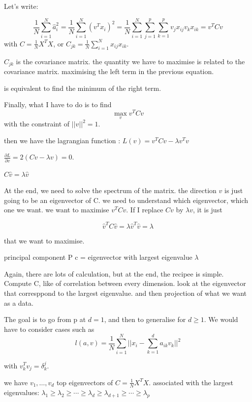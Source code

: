 \documentclass[a4paper]{tufte-book}
\newcommand{\nth}{\frac{1}{N}}
\newcommand{\sumin}{\sum_{i=1}^N}
\begin{document}
Let's write: 

\begin{equation}
    \nth \sumin \hat a_i^2 = \nth \sumin (v^T x_i)^2 = \nth \sumin \sum_{j=1}^p \sum_{k=1}^p v_j x_{ij} v_k x_{ik} = v^T C v
\end{equation}
with $C = \nth X^T X$, or $C_{jk} = \nth \sumin x_{ij} x_{ik}$.

$C_{jk}$ is the covariance matrix. the quantity we have to maximise is related
to the covariance matrix. maximising the left term in the previous equation.

is equivalent to find the minimum of the right term.

Finally, what I have to do is to find
$$ \max_v v^T C v $$
with the constraint of $||v||^2 = 1 $.

then we have the lagrangian function : 
$L (v) = v^T C v - \lambda v^T v$

$\frac{\partial L}{\partial v} = 2 (Cv-\lambda v) = 0$.

$C \hat v = \lambda \hat v$

At the end, we need to solve the spectrum of the matrix.
the direction $v$ is just going to be an eigenvector of C.
we need to understand which eigenvector, which one we want.
we want to maximise $v^T C v$. If I replace $C v $ by $\lambda v$, it is just

\begin{equation}
    \hat v^T C \hat v = \lambda \hat v^T \hat v = \lambda
\end{equation}

that we want to maximise.

principal component P c = eigenvector with largest eigenvalue $\lambda$

Again, there are lots of calculation, but at the end, the recipee is simple.
Compute C, like of correlation between every dimension.
look at the eigenvector that corresppond to the largest eigenvalue.
and then projection of what we want as a data.

The goal is to go from p at $d=1$, and then to generalise for $d\geq 1$.
We would have to consider cases such as
\begin{equation}
    l(a,v) = \nth \sumin || x_i - \sum_{k=1}^d a_{ik} v_k ||^2
\end{equation}

with $v_k^T v_j = \delta_k^j$.

we have $v_1,\ldots,v_d$ top eigenvectors of $C = \nth X^T X$.
associated with the largest eigenvalues:
$\lambda_1 \geq \lambda_2 \geq \cdots \geq \lambda_d \geq \lambda_{d+1} \geq \cdots \geq \lambda_p$
\end{document}
